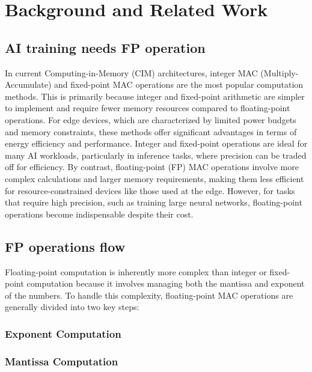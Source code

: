 
\section{Background and Related Work}
\label{sec:Related Work}
\iffalse
\subsection{AI training needs FP operation}
In current Computing-in-Memory (CIM) architectures, integer MAC (Multiply-Accumulate) and fixed-point MAC operations are the most popular computation methods. This is primarily because integer and fixed-point arithmetic are simpler to implement and require fewer memory resources compared to floating-point operations. For edge devices, which are characterized by limited power budgets and memory constraints, these methods offer significant advantages in terms of energy efficiency and performance. Integer and fixed-point operations are ideal for many AI workloads, particularly in inference tasks, where precision can be traded off for efficiency. By contrast, floating-point (FP) MAC operations involve more complex calculations and larger memory requirements, making them less efficient for resource-constrained devices like those used at the edge. However, for tasks that require high precision, such as training large neural networks, floating-point operations become indispensable despite their cost.


\subsection{FP operations flow}
Floating-point computation is inherently more complex than integer or fixed-point computation because it involves managing both the mantissa and exponent of the numbers. To handle this complexity, floating-point MAC operations are generally divided into two key steps:

\subsubsection{Exponent Computation} 

\subsubsection{Mantissa Computation} 

